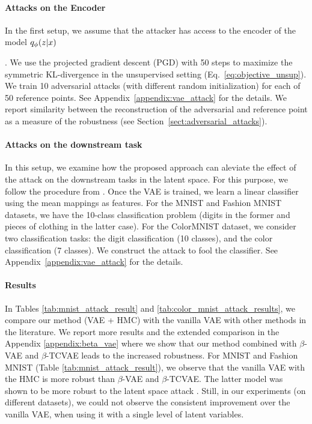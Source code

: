 \paragraph{Attacks on the Encoder} 
In the first setup, we assume that the attacker has access to the encoder of the model ${q_{\phi}(z|x)}$ {\cite{barrett2021certifiably, Gondim-Ribeiro2018-cu, Willetts2019-mu}. We use the projected gradient descent (PGD) with 50 steps to maximize the symmetric KL-divergence in the unsupervised setting (Eq.~\ref{eq:objective_unsup}). We train 10 adversarial attacks (with different random initialization) for each of 50 reference points. See Appendix~\ref{appendix:vae_attack} for the details. We report similarity between the reconstruction of the adversarial and reference point as a measure of the robustness (see Section~\ref{sect:adversarial_attacks}). 

\paragraph{Attacks on the downstream task} 
In this setup, we examine how the proposed approach can aleviate the effect of the attack on the downstream tasks in the latent space. For this purpose, we follow the procedure from \citet{cemgil2020autoencoding, Cemgil2019-vn}. Once the VAE is trained, we learn a linear classifier using the mean mappings as features. For the MNIST and Fashion MNIST datasets, we have the 10-class classification problem (digits in the former and pieces of clothing in the latter case). For the ColorMNIST dataset, we consider two classification tasks: the digit classification (10 classes), and the color classification (7 classes). We construct the attack to fool the classifier. See Appendix~\ref{appendix:vae_attack} for the details.


\paragraph{Results} 
In Tables \ref{tab:mnist_attack_result} and \ref{tab:color_mnist_attack_results}, we compare our method (VAE + HMC) with the vanilla VAE with other methods in the literature. We report more results and the extended comparison in the Appendix \ref{appendix:beta_vae} where we show that our method combined with $\beta$-VAE and $\beta$-TCVAE leads to the increased robustness. For MNIST and Fashion MNIST (Table \ref{tab:mnist_attack_result}), we observe that the vanilla VAE with the HMC is more robust than $\beta$-VAE and $\beta$-TCVAE. The latter model was shown to be more robust to the latent space attack \cite{Willetts2019-mu}. Still, in our experiments (on different datasets), we could not observe the consistent improvement over the vanilla VAE, when using it with a single level of latent variables. 

}
